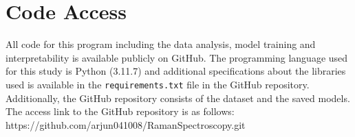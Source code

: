 \section{Code Access}

\noindent All code for this program including the data analysis, model training and interpretability is available publicly on GitHub. The programming language used for this study is Python (3.11.7) and additional specifications about the libraries used is available in the \texttt{requirements.txt} file in the GitHub repository. Additionally, the GitHub repository consists of the dataset and the saved models. The access link to the GitHub repository is as follows: https://github.com/arjun041008/RamanSpectroscopy.git






